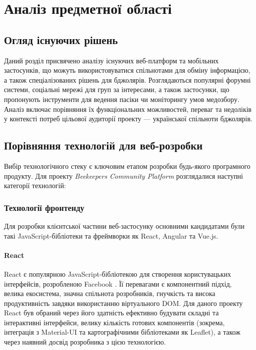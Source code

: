 \chapter{Аналіз предметної області}
\label{ch:analysis}

\section{Огляд існуючих рішень}
\label{sec:existing_solutions}
Даний розділ присвячено аналізу існуючих веб-платформ та мобільних застосунків, що можуть використовуватися спільнотами для обміну інформацією, а також спеціалізованих рішень для бджолярів. Розглядаються популярні форумні системи, соціальні мережі для груп за інтересами, а також застосунки, що пропонують інструменти для ведення пасіки чи моніторингу умов медозбору. Аналіз включає порівняння їх функціональних можливостей, переваг та недоліків у контексті потреб цільової аудиторії проекту — української спільноти бджолярів.

\section{Порівняння технологій для веб-розробки}
\label{sec:tech_comparison}
Вибір технологічного стеку є ключовим етапом розробки будь-якого програмного продукту. Для проекту \textit{Beekeepers Community Platform} розглядалися наступні категорії технологій:

\subsection{Технології фронтенду}
Для розробки клієнтської частини веб-застосунку основними кандидатами були такі JavaScript-бібліотеки та фреймворки як React, Angular та Vue.js.
\subsubsection{React}
React є популярною JavaScript-бібліотекою для створення користувацьких інтерфейсів, розробленою Facebook \cite{react}. Її перевагами є компонентний підхід, велика екосистема, значна спільнота розробників, гнучкість та висока продуктивність завдяки використанню віртуального DOM. Для даного проекту React був обраний через його здатність ефективно будувати складні та інтерактивні інтерфейси, велику кількість готових компонентів (зокрема, інтеграція з Material-UI та картографічними бібліотеками як Leaflet), а також через наявний досвід розробника з цією технологією.

